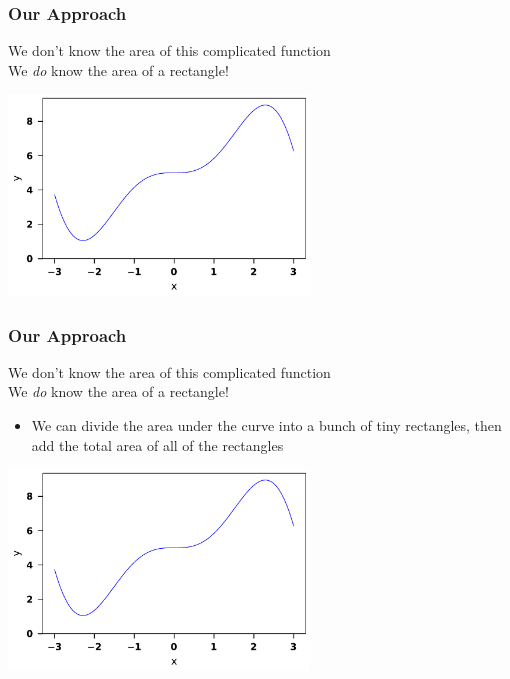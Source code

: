 \documentclass{beamer}
\begin{document}
	\begin{frame}
		\frametitle{Our Approach}
		We don't know the area of this complicated function\\
		We \textit{do} know the area of a rectangle!
		\begin{center}
			\includegraphics[width=8cm]{complicated_function.pdf}
		\end{center}
	\end{frame}

	\begin{frame}
	\frametitle{Our Approach}
	We don't know the area of this complicated function\\
	We \textit{do} know the area of a rectangle!\\
	\begin{itemize}
		\item 	We can divide the area under the curve into a bunch of tiny rectangles, then add the total area of all of the rectangles
	\end{itemize}
	\begin{center}
		\includegraphics[width=8cm]{complicated_function.pdf}
	\end{center}
	\end{frame}
\end{document}
